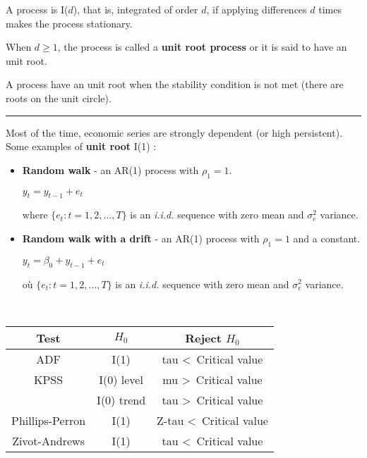   \begin{f}

A process is I(\(d\)), that is, integrated of order \(d\), if applying differences \(d\) times makes the process stationary.

When \(d \geq 1\), the process is called a \textbf{unit root process} or it is said to have an unit root.

A process have an unit root when the stability condition is not met (there are roots on the unit circle).

\end{f}  \hrule  

\begin{f}

Most of the time, economic series are strongly dependent (or high persistent). Some examples of \textbf{unit root} I(1) :

\begin{itemize}[leftmargin=*]
	\item \textbf{Random walk} - an AR(1) process with \(\rho_{1} = 1\).
	
	\begin{center}
		\(y_{t} = y_{t - 1} + e_{t}\)
	\end{center}
	
	where \(\lbrace e_{t} : t = 1, 2, \ldots, T \rbrace\) is an \textsl{i.i.d.} sequence with zero mean and \(\sigma^{2}_{e}\) variance.
	
	\item \textbf{Random walk with a drift} - an AR(1) process with \(\rho_{1} = 1\) and a constant.
	
	\begin{center}
		\(y_{t} = \beta_{0} + y_{t - 1} + e_{t}\)
	\end{center}
	
	où \(\lbrace e_{t} : t = 1, 2, \ldots, T \rbrace\) is an \textsl{i.i.d.} sequence with zero mean and \(\sigma^{2}_{e}\) variance.
\end{itemize}

\end{f} 

 \begin{f}{\ }

\begin{center}
	\begin{tabular}{ c | c | c }
		Test            & \(H_{0}\)    & Reject \(H_{0}\)                     \\ \hline
		ADF             & I(1)       & tau \textless \, Critical value    \\ \hline
		KPSS            & I(0) level & mu \textgreater \, Critical value  \\
		& I(0) trend & tau \textgreater \, Critical value \\ \hline
		Phillips-Perron & I(1)       & Z-tau \textless \, Critical value  \\ \hline
		Zivot-Andrews   & I(1)       & tau \textless \, Critical value
	\end{tabular}
\end{center}
\medskip

\end{f}  

